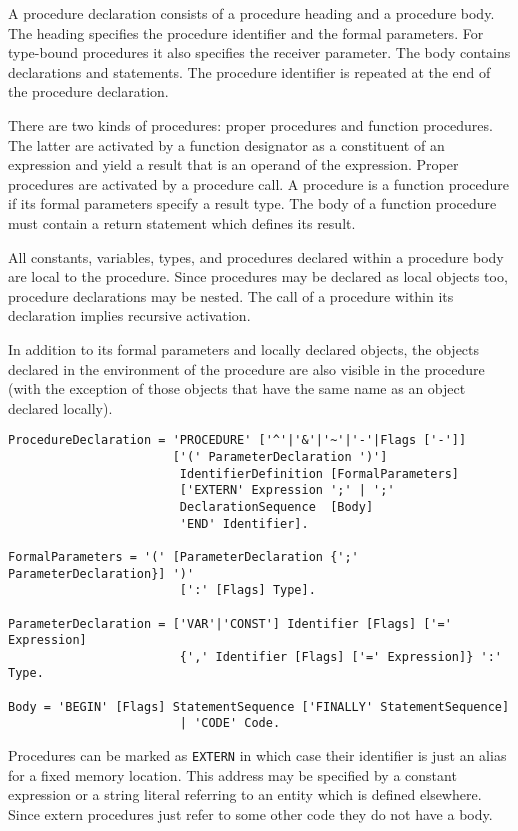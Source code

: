 \documentclass[a4wide,11pt]{article}
\begin{document}
A procedure declaration consists of a procedure heading and a procedure body.
The heading specifies the procedure identifier and the formal parameters.
For type-bound procedures it also specifies the receiver parameter.
The body contains declarations and statements.
The procedure identifier is repeated at the end of the procedure declaration.

There are two kinds of procedures: proper procedures and function procedures.
The latter are activated by a function designator as a constituent of an expression and yield a result that is an operand of the expression.
Proper procedures are activated by a procedure call.
A procedure is a function procedure if its formal parameters specify a result type.
The body of a function procedure must contain a return statement which defines its result.

All constants, variables, types, and procedures declared within a procedure body are local to the procedure.
Since procedures may be declared as local objects too, procedure declarations may be nested.
The call of a procedure within its declaration implies recursive activation.

In addition to its formal parameters and locally declared objects, the objects declared in the environment of the procedure are also visible in the procedure (with the exception of those objects that have the same name as an object declared locally).

\begin{lstlisting}[style=ebnf]
ProcedureDeclaration = 'PROCEDURE' ['^'|'&'|'~'|'-'|Flags ['-']]
                       ['(' ParameterDeclaration ')']
                        IdentifierDefinition [FormalParameters]
                        ['EXTERN' Expression ';' | ';'
                        DeclarationSequence  [Body]
                        'END' Identifier].

FormalParameters = '(' [ParameterDeclaration {';' ParameterDeclaration}] ')'
                        [':' [Flags] Type].

ParameterDeclaration = ['VAR'|'CONST'] Identifier [Flags] ['=' Expression]
						{',' Identifier [Flags] ['=' Expression]} ':' Type.

Body = 'BEGIN' [Flags] StatementSequence ['FINALLY' StatementSequence]
						| 'CODE' Code.
\end{lstlisting}

Procedures can be marked as \lstinline"EXTERN" in which case their identifier is just an alias for a fixed memory location.
This address may be specified by a constant expression or a string literal referring to an entity which is defined elsewhere.
Since extern procedures just refer to some other code they do not have a body.
\end{document}
